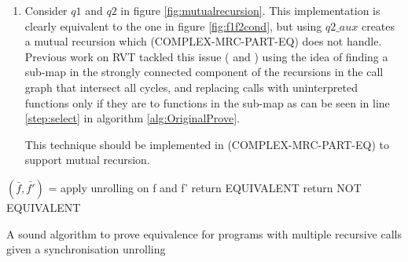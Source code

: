 \begin{enumerate}
\item Consider $q1$ and $q2$ in figure \ref{fig:mutualrecursion}. This implementation is clearly equivalent to the one in figure \ref{fig:f1f2cond}, but using $q2\_aux$ creates a mutual recursion which (COMPLEX-MRC-PART-EQ) does not handle. Previous work on RVT tackled this issue (\cite{DBLP:conf/dac/GodlinS09} and \cite{DBLP:conf/fm/StrichmanV16}) using the idea of finding a sub-map in the strongly connected component of the recursions in the call graph that intersect all cycles, and replacing calls with uninterpreted functions only if they are to functions   in the sub-map as can be seen in line \ref{step:select} in algorithm \ref{alg:OriginalProve}.

This technique should be implemented in (COMPLEX-MRC-PART-EQ) to support mutual recursion.
\end{enumerate}



































\iffalse
\noindent
\begin{algorithm}
\begin{minipage}{\linewidth}
\begin{algorithmic}[1]
	\State$(\bar{f},\bar{f'})$ = apply unrolling on f and f'
	\State	return EQUIVALENT
	\Else
	\State	return NOT EQUIVALENT
		\EndIf
	\EndFunction
\end{algorithmic}
\end{minipage}
\caption{A sound algorithm to prove equivalence for programs with multiple recursive calls given a synchronisation unrolling}
\label{alg:ProveWithUnrolling}
\end{algorithm}
   
